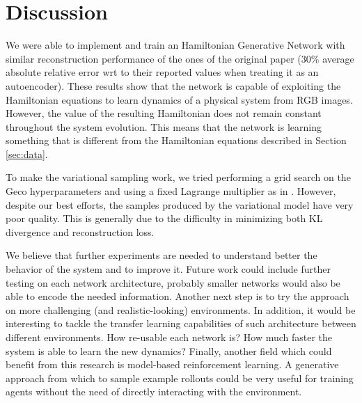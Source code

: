 \section{Discussion}
\label{sec:disc}

We were able to implement and train an Hamiltonian Generative Network with similar reconstruction performance of the ones of the original paper  ($30\%$ average absolute relative error wrt to their reported values when treating it as an autoencoder). These results show that the network is capable of exploiting the Hamiltonian equations to learn dynamics of a physical system from RGB images. However, the value of the resulting Hamiltonian does not remain constant throughout the system evolution. 
This means that the network is learning something that is different from the Hamiltonian equations described in Section \ref{sec:data}.

To make the variational sampling work, we tried performing a grid search on the Geco\cite{geco} hyperparameters and using a fixed Lagrange multiplier as in \cite{beta-vae}. However, despite our best efforts, the samples produced by the variational model have very poor quality. This is generally due to the difficulty in minimizing both KL divergence and reconstruction loss. 

We believe that further experiments are needed to understand better the behavior of the system and to improve it. Future work could include further testing on each network architecture, probably smaller networks would also be able to encode the needed information. Another next step is to try the approach on more challenging (and realistic-looking) environments. In addition, it would be interesting to tackle the transfer learning capabilities of such architecture between different environments. How re-usable each network is? How much faster the system is able to learn the new dynamics? Finally, another field which could benefit from this research is model-based reinforcement learning.
A generative approach from which to sample example rollouts could be very useful for training agents without the need of directly interacting with the environment.

